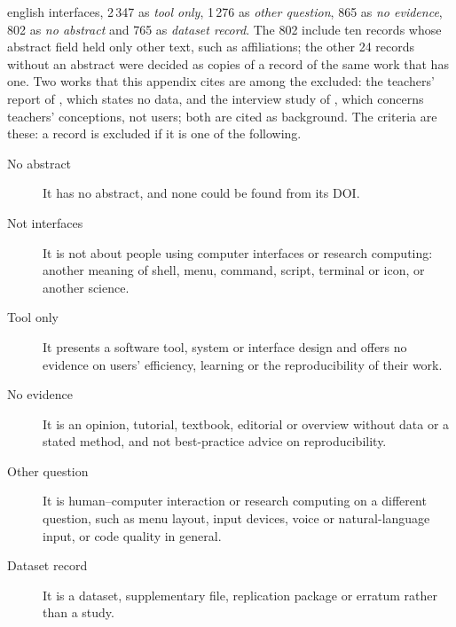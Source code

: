 \begin{onlyin}{english}
{interfaces}, 2\,347 as \emph{tool only}, 1\,276 as \emph{other
question}, 865 as \emph{no evidence}, 802 as \emph{no abstract} and 765
as \emph{dataset record}.  The 802 include ten records whose abstract
field held only other text, such as affiliations; the other 24 records
without an abstract were decided as copies of a record of the same work
that has one.  Two works that this appendix cites are among the
excluded: the teachers' report of \textcite{Kendon2016Unix}, which states
no data, and the interview study of \textcite{Doyle2007Why}, which
concerns teachers' conceptions, not users; both are cited as background.
The criteria are these: a record is
excluded if it is one of the following.
\begin{description}
  \item[No abstract] It has no abstract, and none could be found from
    its DOI.
  \item[Not interfaces] It is not about people using computer
    interfaces or research computing: another meaning of shell, menu,
    command, script, terminal or icon, or another science.
  \item[Tool only] It presents a software tool, system or interface
    design and offers no evidence on users' efficiency, learning or the
    reproducibility of their work.
  \item[No evidence] It is an opinion, tutorial, textbook, editorial or
    overview without data or a stated method, and not best-practice
    advice on reproducibility.
  \item[Other question] It is human--computer interaction or research
    computing on a different question, such as menu layout, input
    devices, voice or natural-language input, or code quality in
    general.
  \item[Dataset record] It is a dataset, supplementary file,
    replication package or erratum rather than a study.
\end{description}
\end{onlyin}
